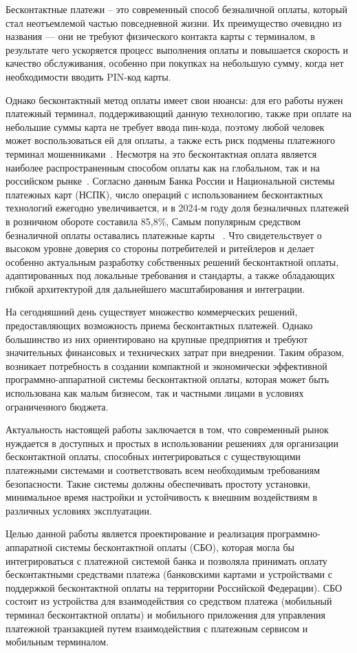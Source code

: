 \newpage


Бесконтактные платежи – это современный способ безналичной оплаты, который стал неотъемлемой частью повседневной жизни.
Их преимущество очевидно из названия --- они не требуют физического контакта карты с терминалом, в результате чего ускоряется процесс выполнения оплаты и повышается скорость и качество обслуживания, особенно при покупках на небольшую сумму, когда нет необходимости вводить PIN-код карты.

Однако бесконтактный метод оплаты имеет свои нюансы: для его работы нужен платежный терминал, поддерживающий данную технологию, также при оплате на небольшие суммы карта не требует ввода пин-кода, поэтому любой человек может воспользоваться ей для оплаты, а также есть риск подмены платежного терминал мошенниками~\cite{codejournal}.
Несмотря на это бесконтактная оплата является наиболее распространенным способом оплаты как на глобальном, так и на российском рынке~\cite{posterminals}.
Согласно данным Банка России и Национальной системы платежных карт (НСПК), число операций с использованием бесконтактных технологий ежегодно увеличивается, и в 2024-м году доля безналичных платежей в розничном обороте составила 85,8\%,
Самым популярным средством безналичной оплаты оставались платежные карты
~\cite{cdrf_report2024,cdrf_results2024}.
Что свидетельствует о высоком уровне доверия со стороны потребителей и ритейлеров и делает особенно актуальным разработку собственных решений бесконтактной оплаты, адаптированных под локальные требования и стандарты, а также обладающих гибкой архитектурой для дальнейшего масштабирования и интеграции.

На сегодняшний день существует множество коммерческих решений, предоставляющих возможность приема бесконтактных платежей.
Однако большинство из них ориентировано на крупные предприятия и требуют значительных финансовых и технических затрат при внедрении.
Таким образом, возникает потребность в создании компактной и экономически эффективной программно-аппаратной системы бесконтактной оплаты, которая может быть использована как малым бизнесом, так и частными лицами в условиях ограниченного бюджета.


Актуальность настоящей работы заключается в том, что современный рынок нуждается в доступных и простых в использовании решениях для организации бесконтактной оплаты, способных интегрироваться с существующими платежными системами и соответствовать всем необходимым требованиям безопасности.
Такие системы должны обеспечивать простоту установки, минимальное время настройки и устойчивость к внешним воздействиям в различных условиях эксплуатации.


Целью данной работы является проектирование и реализация программно-аппаратной системы бесконтактной оплаты (СБО), которая могла бы интегрироваться с платежной системой банка и позволяла принимать оплату бесконтактными средствами платежа (банковскими картами и устройствами с поддержкой бесконтактной оплаты на территории Российской Федерации).
СБО состоит из устройства для взаимодействия со средством платежа (мобильный терминал бесконтактной оплаты) и мобильного приложения для управления платежной транзакцией путем взаимодействия с платежным сервисом и мобильным терминалом.
